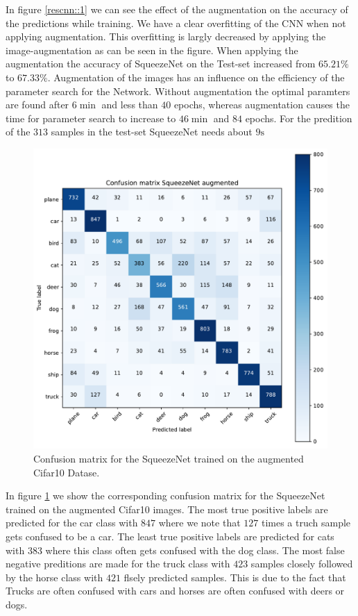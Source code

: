 \documentclass[11pt]{article}
\begin{document}
In figure \ref{rescnn::1} we can see the effect of the augmentation on the accuracy of the predictions while training. We have a clear overfitting of the CNN when not applying augmentation. This overfitting is largly decreased by applying the image-augmentation as can be seen in the figure. When applying the augmentation the accuracy of SqueezeNet on the Test-set increased from $65.21\%$ to $67.33\%$. Augmentation of the images has an influence on the efficiency of the parameter search for the Network. Without augmentation the optimal paramters are found after $6 \min$ and less than $40$ epochs, whereas augmentation causes the time for parameter search to increase to $46 \min$ and $84$ epochs. For the predition of the $313$ samples in the test-set SqueezeNet needs about $9 \text{s}$ 

\begin{figure}
\centering
\includegraphics[width=0.5\columnwidth]{squeezeNet_cifar10_aug_confmat.pdf}
\caption{Confusion matrix for the SqueezeNet trained on the augmented Cifar10 Datase.}
\label{rescnn::2}
\end{figure}

In figure \ref{rescnn::2} we show the corresponding confusion matrix for the SqueezeNet trained on the augmented Cifar10 images. The most true positive labels are predicted for the car class with $847$ where we note that $127$ times a truch sample gets confused to be a car. The least true positive labels are predicted for cats with $383$ where this class often gets confused with the dog class. The most false negative preditions are made for the truck class with $423$ samples closely followed by the horse class with $421$ flsely predicted samples. This is due to the fact that Trucks are often confused with cars and horses are often confused with deers or dogs.
\end{document}
